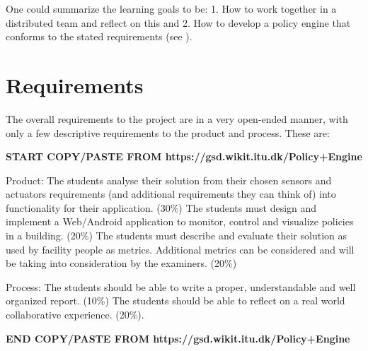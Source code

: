 One could summarize the learning goals to be: 1. How to work together in a distributed team and reflect on this and 2. How to develop a policy engine that conforms to the stated requirements (see ).

\section{Requirements} \label{sec:requirements}
The overall requirements to the project are in a very open-ended manner, with only a few descriptive requirements to the product and process. These are:

\textbf{START COPY/PASTE FROM https://gsd.wikit.itu.dk/Policy+Engine}

Product:
The students analyse their solution from their chosen sensors and actuators requirements (and additional requirements they can think of) into functionality for their application. (30\%)
The students must design and implement a Web/Android application to monitor, control and visualize policies in a building. (20\%)
The students must describe and evaluate their solution as used by facility people as metrics. Additional metrics can be considered and will be taking into consideration by the examiners. (20\%)

Process:
The students should be able to write a proper, understandable and well organized report. (10\%)
The students should be able to reflect on a real world collaborative experience. (20\%).

\textbf{END COPY/PASTE FROM https://gsd.wikit.itu.dk/Policy+Engine}


